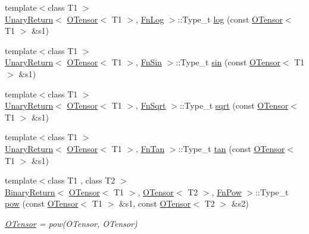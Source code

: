 \begin{DoxyCompactItemize}
\item 
{\footnotesize template$<$class T1 $>$ }\\\mbox{\hyperlink{structENSEM_1_1UnaryReturn}{Unary\+Return}}$<$ \mbox{\hyperlink{classENSEM_1_1OTensor}{O\+Tensor}}$<$ T1 $>$, \mbox{\hyperlink{structENSEM_1_1FnLog}{Fn\+Log}} $>$\+::Type\+\_\+t \mbox{\hyperlink{group__obstensor_ga256d486f79c6bee5428762a951322949}{log}} (const \mbox{\hyperlink{classENSEM_1_1OTensor}{O\+Tensor}}$<$ T1 $>$ \&s1)
\item 
{\footnotesize template$<$class T1 $>$ }\\\mbox{\hyperlink{structENSEM_1_1UnaryReturn}{Unary\+Return}}$<$ \mbox{\hyperlink{classENSEM_1_1OTensor}{O\+Tensor}}$<$ T1 $>$, \mbox{\hyperlink{structENSEM_1_1FnSin}{Fn\+Sin}} $>$\+::Type\+\_\+t \mbox{\hyperlink{group__obstensor_gaa4e4751f0d9a575eaac0fb52f7bb0c73}{sin}} (const \mbox{\hyperlink{classENSEM_1_1OTensor}{O\+Tensor}}$<$ T1 $>$ \&s1)
\item 
{\footnotesize template$<$class T1 $>$ }\\\mbox{\hyperlink{structENSEM_1_1UnaryReturn}{Unary\+Return}}$<$ \mbox{\hyperlink{classENSEM_1_1OTensor}{O\+Tensor}}$<$ T1 $>$, \mbox{\hyperlink{structENSEM_1_1FnSqrt}{Fn\+Sqrt}} $>$\+::Type\+\_\+t \mbox{\hyperlink{group__obstensor_gab4101323c19945bf42cbece4b0c2e8b4}{sqrt}} (const \mbox{\hyperlink{classENSEM_1_1OTensor}{O\+Tensor}}$<$ T1 $>$ \&s1)
\item 
{\footnotesize template$<$class T1 $>$ }\\\mbox{\hyperlink{structENSEM_1_1UnaryReturn}{Unary\+Return}}$<$ \mbox{\hyperlink{classENSEM_1_1OTensor}{O\+Tensor}}$<$ T1 $>$, \mbox{\hyperlink{structENSEM_1_1FnTan}{Fn\+Tan}} $>$\+::Type\+\_\+t \mbox{\hyperlink{group__obstensor_gaaea33431d7f292c563a371d23c31eb07}{tan}} (const \mbox{\hyperlink{classENSEM_1_1OTensor}{O\+Tensor}}$<$ T1 $>$ \&s1)
\item 
{\footnotesize template$<$class T1 , class T2 $>$ }\\\mbox{\hyperlink{structENSEM_1_1BinaryReturn}{Binary\+Return}}$<$ \mbox{\hyperlink{classENSEM_1_1OTensor}{O\+Tensor}}$<$ T1 $>$, \mbox{\hyperlink{classENSEM_1_1OTensor}{O\+Tensor}}$<$ T2 $>$, \mbox{\hyperlink{structENSEM_1_1FnPow}{Fn\+Pow}} $>$\+::Type\+\_\+t \mbox{\hyperlink{group__obstensor_ga94691b9c2a192ce60f55f93a4ccf1974}{pow}} (const \mbox{\hyperlink{classENSEM_1_1OTensor}{O\+Tensor}}$<$ T1 $>$ \&s1, const \mbox{\hyperlink{classENSEM_1_1OTensor}{O\+Tensor}}$<$ T2 $>$ \&s2)
\begin{DoxyCompactList}\small\item\em \mbox{\hyperlink{classENSEM_1_1OTensor}{O\+Tensor}} = pow(\+O\+Tensor, O\+Tensor) \end{DoxyCompactList}\item 

\end{DoxyCompactItemize}
